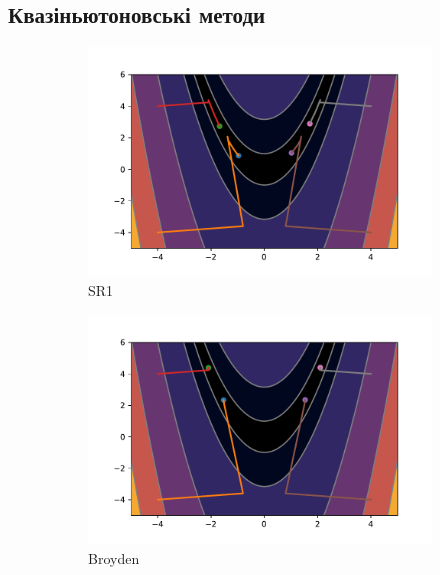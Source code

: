 \pagebreak
\subsection*{Квазіньютоновські методи}

\begin{figure}[h!]
    \begin{subfigure}{0.5\textwidth}
        \includegraphics[width=\textwidth, trim=1cm 0.5cm 1.3cm 1cm, clip]{assets/SR1/rosenbrock.pdf}
        \caption{SR1}
    \end{subfigure}
    \begin{subfigure}{0.5\textwidth}
        \includegraphics[width=\textwidth, trim=1cm 0.5cm 1.3cm 1cm, clip]{assets/Broyden/rosenbrock.pdf}
        \caption{Broyden}
    \end{subfigure}
    \begin{subfigure}{0.5\textwidth}

\end{subfigure}
\end{figure}
